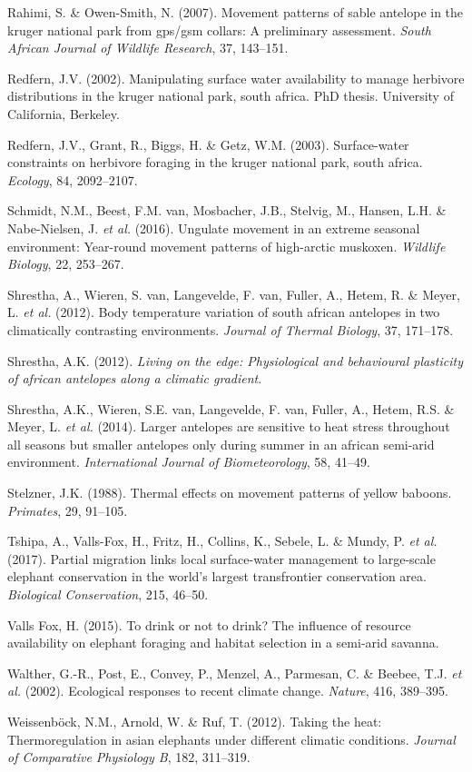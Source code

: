 \documentclass[10pt,twocolumn]{paper}
\begin{document}
\hypertarget{ref-rahimi2007movement}{}
Rahimi, S. \& Owen-Smith, N. (2007). Movement patterns of sable antelope
in the kruger national park from gps/gsm collars: A preliminary
assessment. \emph{South African Journal of Wildlife Research}, 37,
143--151.

\hypertarget{ref-redfern2002manipulating}{}
Redfern, J.V. (2002). Manipulating surface water availability to manage
herbivore distributions in the kruger national park, south africa.
PhD thesis. University of California, Berkeley.

\hypertarget{ref-ECY:ECY20038482092}{}
Redfern, J.V., Grant, R., Biggs, H. \& Getz, W.M. (2003). Surface-water
constraints on herbivore foraging in the kruger national park, south
africa. \emph{Ecology}, 84, 2092--2107.

\hypertarget{ref-schmidt2016ungulate}{}
Schmidt, N.M., Beest, F.M. van, Mosbacher, J.B., Stelvig, M., Hansen,
L.H. \& Nabe-Nielsen, J. \emph{et al.} (2016). Ungulate movement in an
extreme seasonal environment: Year-round movement patterns of
high-arctic muskoxen. \emph{Wildlife Biology}, 22, 253--267.

\hypertarget{ref-shrestha2012171}{}
Shrestha, A., Wieren, S. van, Langevelde, F. van, Fuller, A., Hetem, R.
\& Meyer, L. \emph{et al.} (2012). Body temperature variation of south
african antelopes in two climatically contrasting environments.
\emph{Journal of Thermal Biology}, 37, 171--178.

\hypertarget{ref-shrestha2012living}{}
Shrestha, A.K. (2012). \emph{Living on the edge: Physiological and
behavioural plasticity of african antelopes along a climatic gradient}.

\hypertarget{ref-Shrestha2014}{}
Shrestha, A.K., Wieren, S.E. van, Langevelde, F. van, Fuller, A., Hetem,
R.S. \& Meyer, L. \emph{et al.} (2014). Larger antelopes are sensitive
to heat stress throughout all seasons but smaller antelopes only during
summer in an african semi-arid environment. \emph{International Journal
of Biometeorology}, 58, 41--49.

\hypertarget{ref-Stelzner1988}{}
Stelzner, J.K. (1988). Thermal effects on movement patterns of yellow
baboons. \emph{Primates}, 29, 91--105.

\hypertarget{ref-TSHIPA201746}{}
Tshipa, A., Valls-Fox, H., Fritz, H., Collins, K., Sebele, L. \& Mundy,
P. \emph{et al.} (2017). Partial migration links local surface-water
management to large-scale elephant conservation in the world's largest
transfrontier conservation area. \emph{Biological Conservation}, 215,
46--50.

\hypertarget{ref-valls2015drink}{}
Valls Fox, H. (2015). To drink or not to drink? The influence of
resource availability on elephant foraging and habitat selection in a
semi-arid savanna.

\hypertarget{ref-walther2002ecological}{}
Walther, G.-R., Post, E., Convey, P., Menzel, A., Parmesan, C. \&
Beebee, T.J. \emph{et al.} (2002). Ecological responses to recent
climate change. \emph{Nature}, 416, 389--395.

\hypertarget{ref-Weissenbuxf6ck2012}{}
Weissenböck, N.M., Arnold, W. \& Ruf, T. (2012). Taking the heat:
Thermoregulation in asian elephants under different climatic conditions.
\emph{Journal of Comparative Physiology B}, 182, 311--319.
\end{document}
